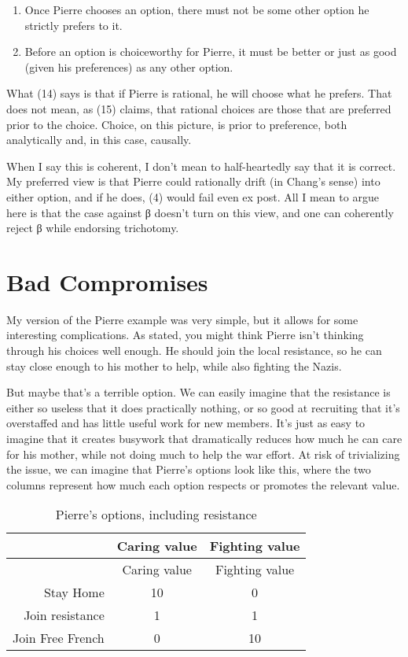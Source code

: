 \documentclass[
  11pt,
  letterpaper,
  DIV=11,
  numbers=noendperiod,
  twoside]{scrartcl}
\providecommand{\tightlist}{%
  \setlength{\itemsep}{0pt}\setlength{\parskip}{0pt}}
\begin{document}
\begin{enumerate}
\def\labelenumi{(\arabic{enumi})}
\setcounter{enumi}{13}
\tightlist
\item
  Once Pierre chooses an option, there must not be some other option he
  strictly prefers to it.
\item
  Before an option is choiceworthy for Pierre, it must be better or just
  as good (given his preferences) as any other option.
\end{enumerate}

What (14) says is that if Pierre is rational, he will choose what he
prefers. That does not mean, as (15) claims, that rational choices are
those that are preferred prior to the choice. Choice, on this picture,
is prior to preference, both analytically and, in this case, causally.

When I say this is coherent, I don't mean to half-heartedly say that it
is correct. My preferred view is that Pierre could rationally drift (in
Chang's sense) into either option, and if he does, (4) would fail even
ex post. All I mean to argue here is that the case against β doesn't
turn on this view, and one can coherently reject β while endorsing
trichotomy.

\section{Bad Compromises}\label{sec-badcomp}

My version of the Pierre example was very simple, but it allows for some
interesting complications. As stated, you might think Pierre isn't
thinking through his choices well enough. He should join the local
resistance, so he can stay close enough to his mother to help, while
also fighting the Nazis.

But maybe that's a terrible option. We can easily imagine that the
resistance is either so useless that it does practically nothing, or so
good at recruiting that it's overstaffed and has little useful work for
new members. It's just as easy to imagine that it creates busywork that
dramatically reduces how much he can care for his mother, while not
doing much to help the war effort. At risk of trivializing the issue, we
can imagine that Pierre's options look like this, where the two columns
represent how much each option respects or promotes the relevant value.

\begin{longtable}[]{@{}rcc@{}}
\caption{Pierre's options, including
resistance}\label{tbl-pierreresist}\tabularnewline
\toprule\noalign{}
& Caring value & Fighting value \\
\midrule\noalign{}
\endfirsthead
\toprule\noalign{}
& Caring value & Fighting value \\
\midrule\noalign{}
\endhead
\bottomrule\noalign{}
\endlastfoot
Stay Home & 10 & 0 \\
Join resistance & 1 & 1 \\
Join Free French & 0 & 10 \\
\end{longtable}
\end{document}
